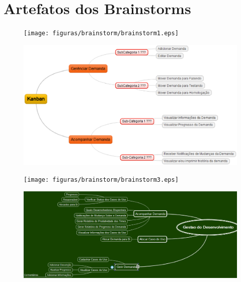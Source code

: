 \chapter[Artefatos dos Brainstorms]{Artefatos dos Brainstorms}

\begin{figure}[H]
	\centering
	\texttt{[image: figuras/brainstorm/brainstorm1.eps]}
	\caption{}
	\label{}
\end{figure}

\begin{figure}[H]
	\centering
	\includegraphics[keepaspectratio=true,scale=0.7]{figuras/brainstorm/brainstorm2.eps}
	\caption{}
	\label{}
\end{figure}

\begin{figure}[H]
	\centering
	\texttt{[image: figuras/brainstorm/brainstorm3.eps]}
	\caption{}
	\label{}
\end{figure}

\begin{figure}[H]
	\centering
	\includegraphics[keepaspectratio=true,scale=0.6]{figuras/brainstorm/brainstorm4.eps}
	\caption{}
	\label{}
\end{figure}